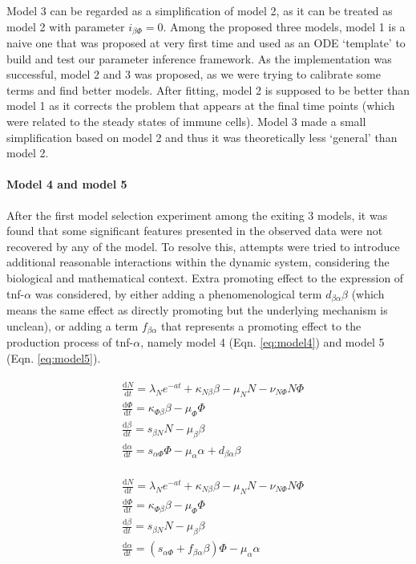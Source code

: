 Model 3 can be regarded as a simplification of model 2, as it can be treated as model 2 with parameter $i_{\beta\Phi}=0$. Among the proposed three models, model 1 is a naive one that was proposed at very first time and used as an ODE `template' to build and test our parameter inference framework. As the implementation was successful, model 2 and 3 was proposed, as we were trying to calibrate some terms and find better models. After fitting, model 2 is supposed to be better than model 1 as it corrects the problem that appears at the final time points (which were related to the steady states of immune cells). Model 3 made a small simplification based on model 2 and thus it was theoretically less `general' than model 2.

\paragraph{Model 4 and model 5}

After the first model selection experiment among the exiting 3 models, it was found that some significant features presented in the observed data were not recovered by any of the model. To resolve this, attempts were tried to introduce additional reasonable interactions within the dynamic system, considering the biological and  mathematical context. Extra promoting effect to the expression of tnf-$\alpha$ was considered, by either adding a phenomenological term $d_{\beta\alpha}\beta$ (which means the same effect as directly promoting but the underlying mechanism is unclean), or adding a term $f_{\beta\alpha}$ that represents a promoting effect to the production process of tnf-$\alpha$, namely model 4 (Eqn. \ref{eq:model4}) and model 5 (Eqn. \ref{eq:model5}).

\begin{align}
    \label{eq:model4}
    \begin{split}
        &\frac{\mathrm{d} N}{\mathrm{d} t}=\lambda_Ne^{-at}+\kappa_{N\beta}\beta-\mu_NN-\nu_{N\Phi}N\Phi\\
        &\frac{\mathrm{d} \Phi}{\mathrm{d} t}=\kappa_{\Phi\beta}\beta-\mu_\Phi\Phi\\
        &\frac{\mathrm{d} \beta}{\mathrm{d} t}=s_{\beta N}N-\mu_\beta\beta\\
        &\frac{\mathrm{d} \alpha}{\mathrm{d} t}=s_{\alpha\Phi}\Phi-\mu_\alpha\alpha+d_{\beta\alpha}\beta
    \end{split}
\end{align}

\begin{align}
    \label{eq:model5}
    \begin{split}
        &\frac{\mathrm{d} N}{\mathrm{d} t}=\lambda_Ne^{-at}+\kappa_{N\beta}\beta-\mu_NN-\nu_{N\Phi}N\Phi\\
        &\frac{\mathrm{d} \Phi}{\mathrm{d} t}=\kappa_{\Phi\beta}\beta-\mu_\Phi\Phi\\
        &\frac{\mathrm{d} \beta}{\mathrm{d} t}=s_{\beta N}N-\mu_\beta\beta\\
        &\frac{\mathrm{d} \alpha}{\mathrm{d} t}=(s_{\alpha\Phi}+f_{\beta\alpha}\beta)\Phi-\mu_\alpha\alpha
    \end{split}
\end{align}

